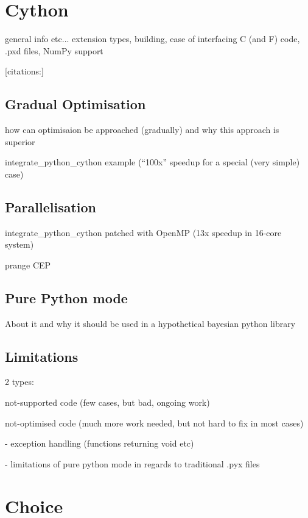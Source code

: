 \documentclass[a4paper,12pt,oneside]{report}
\begin{document}
\section{Cython}

general info etc... extension types, building, ease of interfacing C (and F) code, .pxd files,
NumPy support

[citations:\cite{BehBraSel:09,Sel:09,BehBraCitDalSelSmi:11}]

\subsection{Gradual Optimisation}

how can optimisaion be approached (gradually) and why this approach is superior

integrate\_python\_cython example (``100x'' speedup for a special (very simple) case)

\subsection{Parallelisation}

integrate\_python\_cython patched with OpenMP (13x speedup in 16-core system)

prange CEP

\subsection{Pure Python mode}

About it and why it should be used in a hypothetical bayesian python library

\subsection{Limitations}

2 types:

	not-supported code (few cases, but bad, ongoing work)

	not-optimised code (much more work needed, but not hard to fix in most cases)

		- exception handling (functions returning void etc)

		- limitations of pure python mode in regards to traditional .pyx files

\section{Choice}
\end{document}
